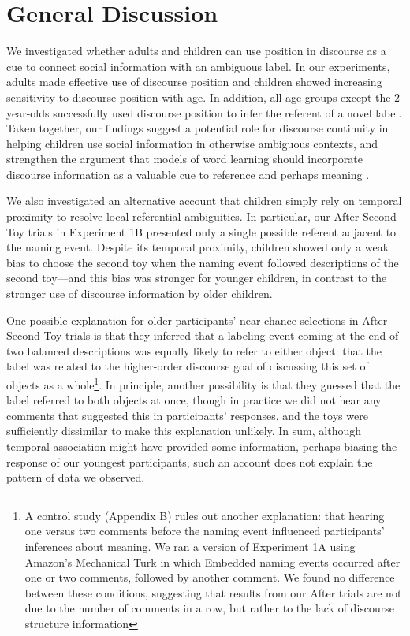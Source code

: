 \documentclass[man]{apa2}
\begin{document}
\section{General Discussion} 

We investigated whether adults and children can use position in discourse as a cue to connect social information with an ambiguous label. In our experiments, adults made effective use of discourse position and children showed increasing sensitivity to discourse position with age. In addition, all age groups except the 2-year-olds successfully used discourse position to infer the referent of a novel label. Taken together, our findings suggest a potential role for discourse continuity in helping children use social information in otherwise ambiguous contexts, and strengthen the argument that models of word learning should incorporate discourse information as a valuable cue to reference and perhaps meaning \cite{luong2013}.

We also investigated an alternative account that children simply rely on temporal proximity to resolve local referential ambiguities.  In particular, our After Second Toy trials in Experiment 1B presented only a single possible referent adjacent to the naming event.  Despite its temporal proximity, children showed only a weak bias to choose the second toy when the naming event followed descriptions of the second toy---and this bias was stronger for younger children, in contrast to the stronger use of discourse information by older children. 

One possible explanation for older participants' near chance selections in After Second Toy trials is that they inferred that a labeling event coming at the end of two balanced descriptions was equally likely to refer to either object: that the label was related to the higher-order discourse goal of discussing this set of objects as a whole\footnote {A control study (Appendix B) rules out another explanation: that hearing one versus two comments before the naming event influenced participants' inferences about meaning.  We ran a version of Experiment 1A using Amazon's Mechanical Turk in which Embedded naming events occurred after one or two comments, followed by another comment.  We found no difference between these conditions, suggesting that results from our After trials are not due to the number of comments in a row, but rather to the lack of discourse structure information}. In principle, another possibility is that they guessed that the label referred to both objects at once, though in practice we did not hear any comments that suggested this in participants' responses, and the toys were sufficiently dissimilar to make this explanation unlikely. In sum, although temporal association might have provided some information, perhaps biasing the response of our youngest participants, such an account does not explain the pattern of data we observed.  
\end{document}

